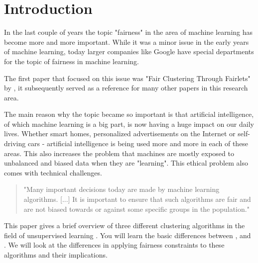 \section{Introduction}

In the last couple of years the topic "fairness" in the area of machine learning has become more and more important. While it was a minor issue in the early years of machine learning, today larger companies like Google have special departments for the topic of fairness in machine learning.

The first paper that focused on this issue was "Fair Clustering Through Fairlets" by \textcite{Chierichetti2018}, it subsequently served as a reference for many other papers in this research area.

The main reason why the topic became so important is that artificial intelligence, of which machine learning is a big part, is now having a huge impact on our daily lives. Whether smart homes, personalized advertisements on the Internet or self-driving cars - artificial intelligence is being used more and more in each of these areas. This also increases the problem that machines are mostly exposed to unbalanced and biased data when they are "learning". This ethical problem also comes with technical challenges.

\begin{quote}
    "Many important decisions today are made by machine learning algorithms. [...] It is important to ensure that such algorithms are fair and are not biased towards or against some specific groups in the population."
\autocite[1]{Bera2019}
\end{quote}

This paper gives a brief overview of three different clustering algorithms in the field of unsupervised learning \autocite[]{Barlow1989}. You will learn the basic differences between  \autocite[]{Chierichetti2018},  \autocite[]{Schmidt2018} and  \autocite[]{Kleindessner2019}. We will look at the differences in applying fairness constraints to these algorithms and their implications.
